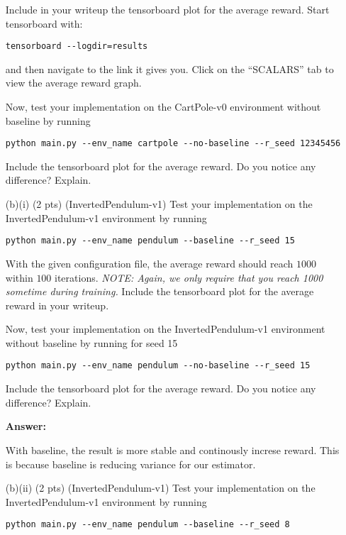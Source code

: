 \documentclass{article}
\begin{document}
\begin{enumerate}
Include in your writeup the tensorboard plot for the average reward. Start tensorboard with:
\begin{tcolorbox}
\begin{verbatim}
tensorboard --logdir=results
\end{verbatim}
\end{tcolorbox}
and then navigate to the link it gives you. Click on the ``SCALARS'' tab to view the average reward graph.

Now, test your implementation on the CartPole-v0 environment without baseline by running
\begin{tcolorbox}
\begin{verbatim}
python main.py --env_name cartpole --no-baseline --r_seed 12345456
\end{verbatim}
\end{tcolorbox}
Include the tensorboard plot for the average reward. Do you notice any difference? Explain.

\item[(b)(i) (2 pts)](InvertedPendulum-v1)
Test your implementation on the InvertedPendulum-v1 environment by running
\begin{tcolorbox}
\begin{verbatim}
python main.py --env_name pendulum --baseline --r_seed 15
\end{verbatim}
\end{tcolorbox}

With the given configuration file, the average reward should reach $1000$ within $100$ iterations. \emph{NOTE: Again, we only require that you reach 1000 sometime during training.} Include the tensorboard plot for the average reward in your writeup.

Now, test your implementation on the InvertedPendulum-v1 environment without baseline by running for seed 15
\begin{tcolorbox}
\begin{verbatim}
python main.py --env_name pendulum --no-baseline --r_seed 15
\end{verbatim}
\end{tcolorbox}
Include the tensorboard plot for the average reward. Do you notice any difference? Explain.

\textbf{Answer:}

With baseline, the result is more stable and continously increse reward. This is because baseline is reducing variance for our estimator.

\item[(b)(ii) (2 pts)](InvertedPendulum-v1)
Test your implementation on the InvertedPendulum-v1 environment by running
\begin{tcolorbox}
\begin{verbatim}
python main.py --env_name pendulum --baseline --r_seed 8
\end{verbatim}
\end{tcolorbox}


\end{enumerate}
\end{document}
